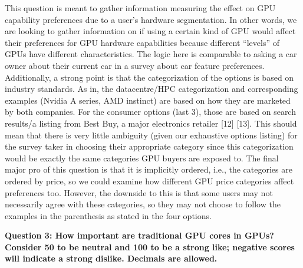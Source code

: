 \documentclass[
]{article}
\begin{document}
This question is meant to gather information measuring the effect on GPU
capability preferences due to a user's hardware segmentation. In other
words, we are looking to gather information on if using a certain kind
of GPU would affect their preferences for GPU hardware capabilities
because different ``levels'' of GPUs have different characteristics. The
logic here is comparable to asking a car owner about their current car
in a survey about car feature preferences. Additionally, a strong point
is that the categorization of the options is based on industry
standards. As in, the datacentre/HPC categorization and corresponding
examples (Nvidia A series, AMD instinct) are based on how they are
marketed by both companies. For the consumer options (last 3), those are
based on search results/a listing from Best Buy, a major electronics
retailer {[}12{]} {[}13{]}. This should mean that there is very little
ambiguity (given our exhaustive options listing) for the survey taker in
choosing their appropriate category since this categorization would be
exactly the same categories GPU buyers are exposed to. The final major
pro of this question is that it is implicitly ordered, i.e., the
categories are ordered by price, so we could examine how different GPU
price categories affect preferences too. However, the downside to this
is that some users may not necessarily agree with these categories, so
they may not choose to follow the examples in the parenthesis as stated
in the four options.

\textbf{Question 3: How important are traditional GPU cores in GPUs?
Consider 50 to be neutral and 100 to be a strong like; negative scores
will indicate a strong dislike. Decimals are allowed. }
\end{document}
